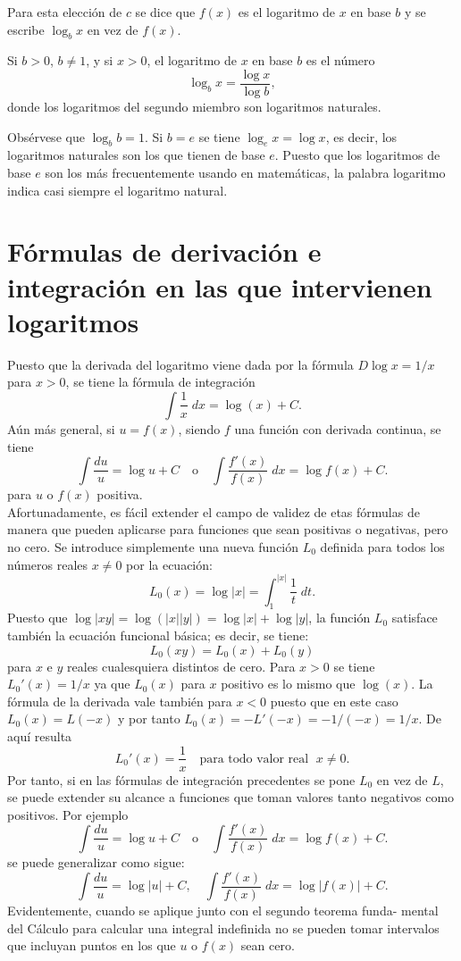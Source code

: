 Para esta elección de $c$ se dice que $f(x)$ es el logaritmo de $x$ en base $b$ y se escribe $\log_b x$ en vez de $f(x)$.

\begin{def.}
    Si $b>0$, $b\neq 1$, y si $x>0$, el logaritmo de $x$ en base $b$ es el número
    $$\log_b x = \dfrac{\log x}{\log b},$$
    donde los logaritmos del segundo miembro son logaritmos naturales.
\end{def.}

Obsérvese que $\log_b b = 1$. Si $b=e$ se tiene $\log_e x= \log x$, es decir, los logaritmos naturales son los que tienen de base $e$. Puesto que los logaritmos de base $e$ son los más frecuentemente usando en matemáticas, la palabra logaritmo indica casi siempre el logaritmo natural.


\section{Fórmulas de derivación e integración en las que intervienen logaritmos}
Puesto que la derivada del logaritmo viene dada por la fórmula $D\log x = 1/x$ para $x>0$, se tiene la fórmula de integración 
$$\int \dfrac{1}{x}\; dx = \log(x)+C.$$
Aún más general, si $u=f(x)$, siendo $f$ una función con derivada continua, se tiene
$$\int \dfrac{du}{u} = \log u + C \quad \mbox{o}\quad \int \dfrac{f'(x)}{f(x)}\; dx = \log f(x) + C.$$
para $u$ o $f(x)$ positiva.\\

Afortunadamente, es fácil extender el campo de validez de etas fórmulas de manera que pueden aplicarse para funciones que sean positivas o negativas, pero no cero. Se introduce simplemente una nueva función $L_0$ definida para todos los números reales $x\neq 0$ por la ecuación:
$$L_0(x)=\log|x|=\int_1^{|x|}\dfrac{1}{t}\; dt.$$
Puesto que $\log|xy|=\log(|x||y|)=\log|x|+\log|y|$, la función $L_0$ satisface también la ecuación funcional básica; es decir, se tiene:
$$L_0(xy)=L_0(x)+L_0(y)$$
para $x$ e $y$ reales cualesquiera distintos de cero. Para $x>0$ se tiene $L_0'(x)=1/x$ ya que $L_0(x)$ para $x$ positivo es lo mismo que $\log(x)$. La fórmula de la derivada vale también para $x<0$ puesto que en este caso $L_0(x)=L(-x)$ y por tanto $L_0(x)=-L'(-x)=-1/(-x)=1/x$. De aquí resulta
$$L_0'(x)=\dfrac{1}{x}\quad \mbox{para todo valor real }\; x\neq 0.$$
Por tanto, si en las fórmulas de integración precedentes se pone $L_0$ en vez de $L$, se puede extender su alcance a funciones que toman valores tanto negativos como positivos. Por ejemplo 
$$\int \dfrac{du}{u} = \log u + C \quad \mbox{o}\quad \int \dfrac{f'(x)}{f(x)}\; dx = \log f(x) + C.$$
se puede generalizar como sigue:
$$\int \dfrac{du}{u} = \log |u| + C, \quad \int \dfrac{f'(x)}{f(x)}\; dx = \log |f(x)| + C.$$
Evidentemente, cuando se aplique junto con el segundo teorema funda- mental del Cálculo para calcular una integral indefinida no se pueden tomar intervalos que incluyan puntos en los que $u$ o $f(x)$ sean cero.


